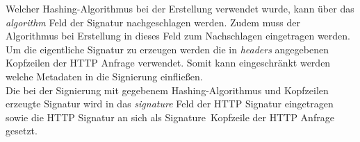 	Welcher Hashing-Algorithmus bei der Erstellung verwendet wurde, kann über das \textit{algorithm} Feld der Signatur nachgeschlagen werden. Zudem muss der Algorithmus bei Erstellung in dieses Feld zum Nachschlagen eingetragen werden.~\\
	
	Um die eigentliche Signatur zu erzeugen werden die in \textit{headers} angegebenen Kopfzeilen der HTTP Anfrage verwendet. Somit kann eingeschränkt werden welche Metadaten in die Signierung einfließen.~\\
	
	Die bei der Signierung mit gegebenem Hashing-Algorithmus und Kopfzeilen erzeugte Signatur wird in das \textit{signature} Feld der HTTP Signatur eingetragen sowie die HTTP Signatur an sich als \glqq Signature\grqq~Kopfzeile der HTTP Anfrage gesetzt.\cite{http-signature}

